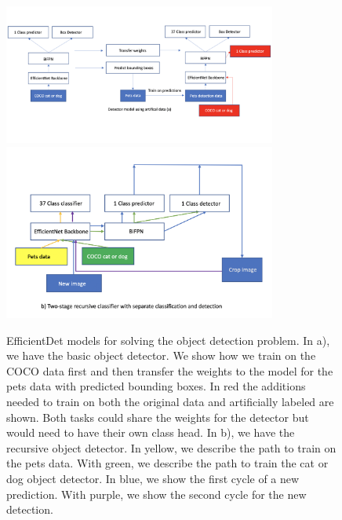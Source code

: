 \begin{figure}[h!] 
\centering 
\includegraphics[width=0.8\textwidth]{imgs/object_detect_combine.png}
\includegraphics[width=0.8\textwidth]{imgs/recursive.png}
\caption{EfficientDet models for solving the object detection problem. In a), we have the basic object detector. We show how we train on the COCO data first and then transfer the weights to the model for the pets data with predicted bounding boxes. In red the additions needed to train on both the original data and artificially labeled are shown. Both tasks could share the weights for the detector but would need to have their own class head.  In b), we have the recursive object detector. In yellow, we describe the path to train on the pets data. With green, we describe the path to train the cat or dog object detector. In blue, we show the first cycle of a new prediction. With purple, we show the second cycle for the new detection.}
\end{figure}

